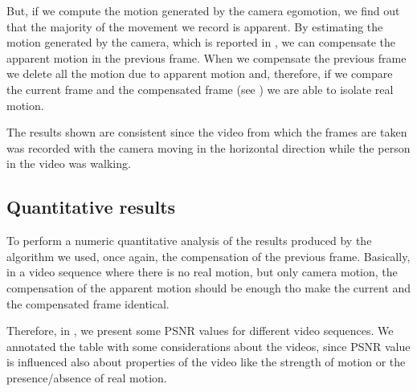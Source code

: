 But, if we compute the motion generated by the camera egomotion, we find out that the majority of the movement we record is apparent.
By estimating the motion generated by the camera, which is reported in  , we can compensate the apparent motion in the previous frame.
When we compensate the previous frame we delete all the motion due to apparent motion and, therefore, if we compare the current frame and the compensated frame (see ) we are able to isolate real motion.

The results shown are consistent since the video from which the frames are taken was recorded with the camera moving in the horizontal direction while the person in the video was walking.

\subsection{Quantitative results}

To perform a numeric quantitative analysis of the results produced by the algorithm we used, once again, the compensation of the previous frame. Basically, in a video sequence where there is no real motion, but only camera motion, the compensation of the apparent motion should be enough tho make the current and the compensated frame identical.

Therefore, in , we present some PSNR values for different video sequences. We annotated the table with some considerations about the videos, since PSNR value is influenced also about properties of the video like the strength of motion or the presence/absence of real motion.

